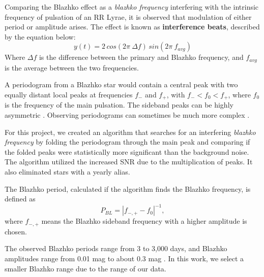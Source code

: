Comparing the Blazhko effect as a {\it blazhko frequency} interfering with the intrinsic frequency of pulsation of an RR Lyrae, it is observed that modulation of either period or amplitude arises. The effect is known as \textbf{interference beats}, described by the equation below:
\begin{equation*}
    y(t) = 2 \, cos(2\pi \ \Delta f) \, sin(2\pi \ f_{avg})
\end{equation*}
Where $\Delta f$ is the difference between the primary and Blazhko frequency, and $f_{avg}$ is the average between the two frequencies.

A periodogram from a Blazhko star would contain a central peak with two equally distant local peaks at frequencies $f_-$ and $f_+$, with $f_- < f_0 < f_+$, where $f_0$ is the frequency of the main pulsation. The sideband peaks can be highly asymmetric
\cite{2003ApJ...598..597A}. Observing periodograms can sometimes be much more complex \cite{2007MNRAS.377.1263S}.  

For this project, we created an algorithm that searches for an interfering \textit{blazhko frequency} by folding the periodogram through the main peak and comparing if the folded peaks were statistically more significant than the background noise. The algorithm utilized the increased SNR due to the multiplication of peaks. It also eliminated stars with a yearly alias.

The Blazhko period, calculated if the algorithm finds the Blazhko frequency, is defined as
\begin{equation*}
P_{BL} = |f_{-,+} - f_0|^{-1},
\end{equation*}
where $f_{-,+}$ means the Blazhko sideband frequency with a higher amplitude is chosen. 

The observed Blazhko periods range from 3 to 3,000 days, and Blazhko amplitudes range from 0.01 mag to about 0.3 mag \citep{2007MNRAS.377.1263S}. In this work, we select a smaller Blazhko range due to the range of our data.

